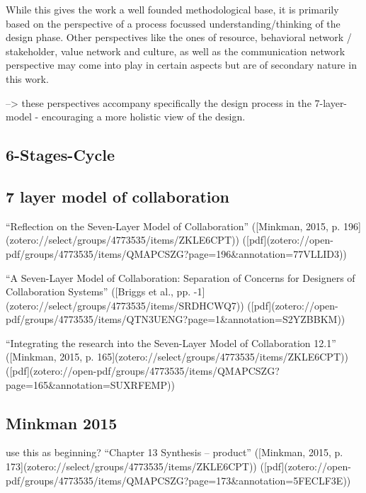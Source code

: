While this gives the work a well founded methodological base, it is primarily based on the perspective of a process focussed understanding/thinking of the design phase. Other perspectives like the ones of resource, behavioral network / stakeholder, value network and culture, as well as the communication network perspective may come into play in certain aspects but are of secondary nature in this work.

--> these perspectives accompany specifically the design process in the 7-layer-model - encouraging a more holistic view of the design.

\subsection{6-Stages-Cycle}




\subsection{7 layer model of collaboration}


“Reflection on the Seven-Layer Model of Collaboration” ([Minkman, 2015, p. 196](zotero://select/groups/4773535/items/ZKLE6CPT)) ([pdf](zotero://open-pdf/groups/4773535/items/QMAPCSZG?page=196&annotation=77VLLID3))



“A Seven-Layer Model of Collaboration: Separation of Concerns for Designers of Collaboration Systems” ([Briggs et al., pp. -1](zotero://select/groups/4773535/items/SRDHCWQ7)) ([pdf](zotero://open-pdf/groups/4773535/items/QTN3UENG?page=1&annotation=S2YZBBKM))

“Integrating the research into the Seven-Layer Model of Collaboration 12.1” ([Minkman, 2015, p. 165](zotero://select/groups/4773535/items/ZKLE6CPT)) ([pdf](zotero://open-pdf/groups/4773535/items/QMAPCSZG?page=165&annotation=SUXRFEMP))

\subsection{Minkman 2015}\label{subsec:guidelines}
use this as beginning?
“Chapter 13 Synthesis – product” ([Minkman, 2015, p. 173](zotero://select/groups/4773535/items/ZKLE6CPT)) ([pdf](zotero://open-pdf/groups/4773535/items/QMAPCSZG?page=173&annotation=5FECLF3E))

